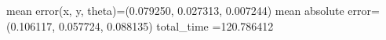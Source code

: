 mean error(x, y, theta)=(0.079250, 0.027313, 0.007244)
mean absolute error=(0.106117, 0.057724, 0.088135)
total_time =120.786412